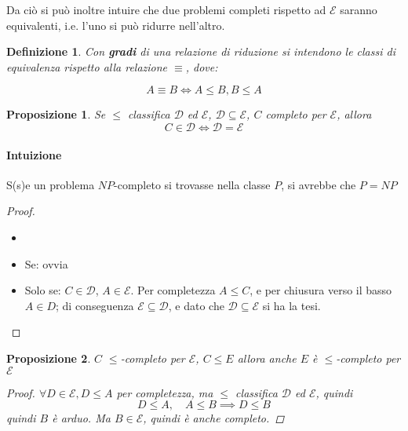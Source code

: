 \documentclass[a4paper,10pt,oneside]{article}
\theoremstyle{break}
\newtheorem{deff}{Definizione}[section]
\newtheorem{prop}{Proposizione}[subsection]
\begin{document}
Da ciò si può inoltre intuire che due problemi completi rispetto ad $\mathcal E$ saranno equivalenti, i.e. l'uno si può ridurre nell'altro.

\dotfill

\begin{deff}
 Con \textbf{gradi} di una relazione di riduzione si intendono le classi di equivalenza rispetto alla relazione $\equiv$, dove:
 
 \[A \equiv B \iff A \leq B, B \leq A\]
\end{deff}

\dotfill

\begin{mdframed}
 \begin{prop}
  Se $\leq$ classifica $\mathcal D$ ed $\mathcal E$, $\mathcal D \subseteq \mathcal E$, $C$ completo per $\mathcal E$, allora \[C \in \mathcal D \iff \mathcal D = \mathcal E\]
 \end{prop}
 
\dotfill
\paragraph{Intuizione} S(s)e un problema $NP$-completo si trovasse nella classe $P$, si avrebbe che $P=NP$

\dotfill

\begin{proof}
 \begin{itemize}
  \item []
  \item Se: ovvia
  \item Solo se: $C \in \mathcal{D}$, $A \in \mathcal E$. Per completezza $A \leq C$, e per chiusura verso il basso $A \in D$; di conseguenza $\mathcal E \subseteq \mathcal D$, e dato che $\mathcal D \subseteq \mathcal E$ si ha la tesi.
 \end{itemize}

\end{proof}

\end{mdframed}

\newpage

\begin{mdframed}
\begin{prop}
 $C$ $\leq$-completo per $\mathcal E$, $C \leq E$ allora anche $E$ è $\leq$-completo per $\mathcal E$
 
 \dotfill
 
 \begin{proof}
 $\forall D \in \mathcal E, D \leq A$ per completezza, ma $\leq$ classifica $\mathcal{D}$ ed $\mathcal{E}$, quindi \[D \leq A,\quad A \leq B \implies D \leq B\]quindi $B$ è arduo. Ma $B \in \mathcal E$, quindi è anche completo.
 
 \end{proof}

\end{prop}

\end{mdframed}
\end{document}
